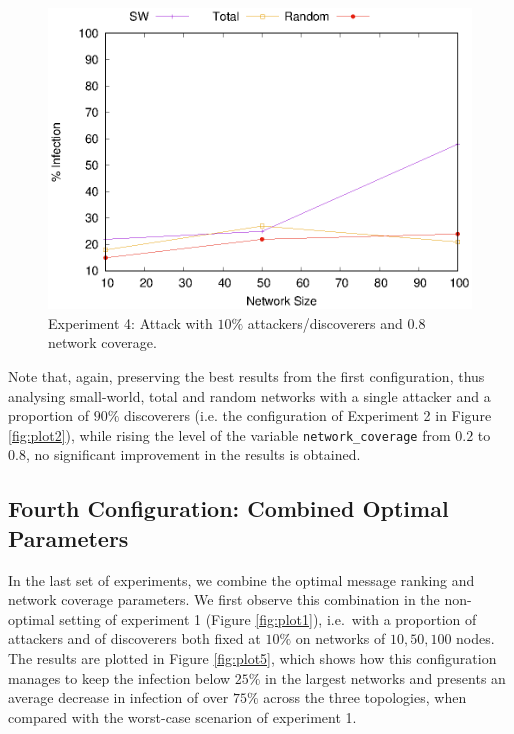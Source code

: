\documentclass[compsoc, conference, letterpaper, 10pt, times]{IEEEtran}
\begin{document}
\begin{figure}
\includegraphics[scale=0.70]{4thconfig_10_90}
\caption{Experiment 4: Attack with $10\%$ attackers/discoverers and $0.8$ network coverage.}\label{fig:plot4}
\end{figure}
Note that, again, preserving the best results from the first configuration, thus analysing small-world, total and random networks with a single attacker and a proportion of $90\%$ discoverers (i.e. the configuration of Experiment 2 in Figure \ref{fig:plot2}), while rising the level of the variable \texttt{network\_coverage} from $0.2$ to $0.8$, no significant improvement in the results is obtained.

\subsection{Fourth Configuration: Combined Optimal Parameters}

In the last set of experiments, we combine the optimal message ranking and network coverage parameters. We first observe this combination in the non-optimal setting of experiment 1 (Figure \ref{fig:plot1}), i.e.\ with a proportion of attackers and of discoverers both fixed at $10\%$ on networks of $10,50,100$ nodes. The results are plotted in Figure \ref{fig:plot5}, which shows how this configuration manages to keep the infection below $25\%$ in the largest networks and presents an average decrease in infection of over $75\%$ across the three topologies, when compared with the worst-case scenarion of experiment 1.
\end{document}
